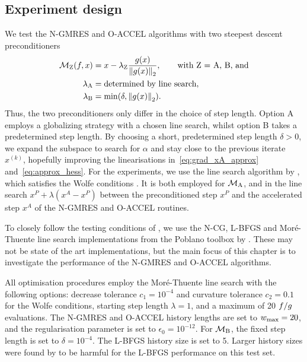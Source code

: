 \documentclass[main.tex]{subfiles}
\begin{document}
\subsection{Experiment design}\label{subsec:experiment_design}
We test the N-GMRES and O-ACCEL algorithms with two steepest descent
preconditioners
\begin{align}
  \mathcal{M}_{\text{Z}}(f,x) &= x-\lambda_{\text{Z}} \frac{g(x)}{\left\lVert g(x)\right\rVert_2}, \qquad
                               \text{with Z = A, B, and}\nonumber\\
  \lambda_{\text{A}} &= \text{determined by line search},\\
  \lambda_{\text{B}} &= \min(\delta,\left\lVert g(x)\right\rVert_2).
\end{align}
Thus, the two preconditioners only differ in the choice of step
length. Option A employs a globalizing strategy with a chosen line
search, whilst option B takes a predetermined step length.  By
choosing a short, predetermined step length $\delta>0$, we expand the
subspace to search for $\alpha$ and stay close to the previous iterate
$x^{(k)}$, hopefully improving the linearisations
in~\eqref{eq:grad_xA_approx} and~\eqref{eq:approx_hess}.  For the
experiments, we use the line search algorithm by \citet{more1994line},
which satisfies the Wolfe conditions \citep{nocedal2006numerical}.  It
is both employed for $\mathcal{M}_{\text{A}}$, and in the line search
$x^P+\lambda(x^A-x^P)$ between the preconditioned step $x^P$ and the
accelerated step $x^A$ of the N-GMRES and O-ACCEL routines.

To closely follow the testing conditions of
\citet{sterck2013steepest}, we use the N-CG, L-BFGS and
Mor\'{e}-Thuente line search implementations from the Poblano toolbox
by \citet{dunlavy2010poblano}.  These may not be state of the art
implementations, but the main focus of this chapter is to
investigate the performance of the N-GMRES and O-ACCEL
algorithms. %

All optimisation procedures employ the Mor\'{e}-Thuente line search
with the following options: decrease tolerance $c_1=10^{-4}$ and
curvature tolerance $c_2=0.1$ for the Wolfe conditions, starting step
length $\lambda=1$, and a maximum of \num{20} $f/g$
evaluations.  The N-GMRES and O-ACCEL history lengths are set to
$w_{\textnormal{max}}=20$, and the regularisation parameter is set to
$\epsilon_0=10^{-12}$.  For $\mathcal{M}_{\text{B}}$, the fixed step
length is set to $\delta=10^{-4}$.  The L-BFGS history size is set to
\num{5}. Larger history sizes were found by \citet{sterck2013steepest}
to be harmful for the L-BFGS performance on this test set.
\end{document}
